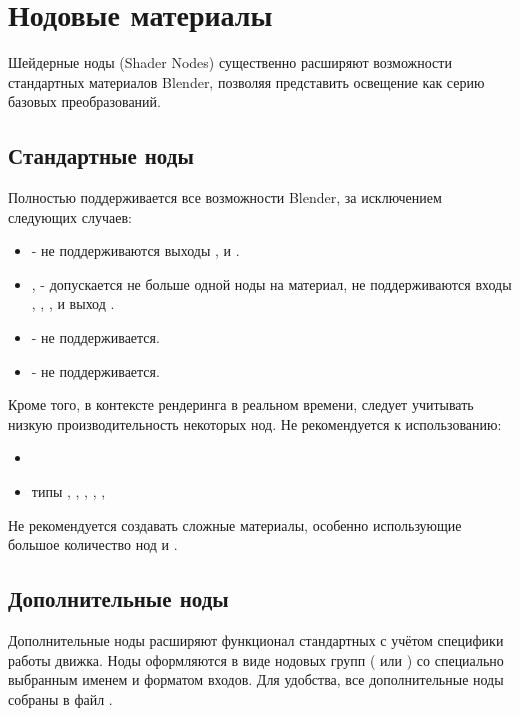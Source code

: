 \documentclass[a4paper,12pt,oneside]{sphinxmanual}
\begin{document}
\chapter{Нодовые материалы}
\label{node_materials:index-0}\label{node_materials::doc}\label{node_materials:id1}
Шейдерные ноды (Shader Nodes) существенно расширяют возможности стандартных материалов Blender, позволяя представить освещение как серию базовых преобразований.


\section{Стандартные ноды}
\label{node_materials:id2}\label{node_materials:index-1}\label{node_materials:generic-node-materials}
Полностью поддерживается все возможности Blender, за исключением следующих случаев:
\begin{itemize}
\item {} 
 - не поддерживаются выходы ,  и .

\item {} 
,  - допускается не больше одной ноды на материал,
не поддерживаются входы , , ,  и выход .

\item {} 
 - не поддерживается.

\item {} 
 - не поддерживается.

\end{itemize}

Кроме того, в контексте рендеринга в реальном времени, следует учитывать низкую производительность некоторых нод. Не рекомендуется к использованию:
\begin{itemize}
\item {} 

\item {} 
 типы , , , , , 

\end{itemize}

Не рекомендуется создавать сложные материалы, особенно использующие большое
количество нод  и .


\section{Дополнительные ноды}
\label{node_materials:custom-node-materials}\label{node_materials:id3}
Дополнительные ноды расширяют функционал стандартных с учётом специфики работы движка. Ноды оформляются в виде нодовых групп ( или ) со специально выбранным именем и форматом входов. Для удобства, все дополнительные ноды собраны в файл .
\end{document}
